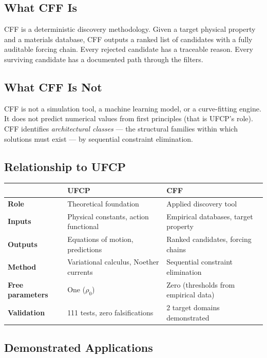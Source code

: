 \documentclass[11pt, a4paper]{article}
\begin{document}
\subsection*{What CFF Is}

CFF is a deterministic discovery methodology. Given a target physical
property and a materials database, CFF outputs a ranked list of
candidates with a fully auditable forcing chain. Every rejected
candidate has a traceable reason. Every surviving candidate has a
documented path through the filters.

\subsection*{What CFF Is Not}

CFF is not a simulation tool, a machine learning model, or a
curve-fitting engine. It does not predict numerical values from
first principles (that is UFCP's role). CFF identifies
\textit{architectural classes} --- the structural families within
which solutions must exist --- by sequential constraint elimination.

\subsection*{Relationship to UFCP}

\begin{center}
\begin{tabular}{@{}lll@{}}
\toprule
& \textbf{UFCP} & \textbf{CFF} \\
\midrule
\textbf{Role} & Theoretical foundation & Applied discovery tool \\
\textbf{Inputs} & Physical constants, action functional &
  Empirical databases, target property \\
\textbf{Outputs} & Equations of motion, predictions &
  Ranked candidates, forcing chains \\
\textbf{Method} & Variational calculus, Noether currents &
  Sequential constraint elimination \\
\textbf{Free parameters} & One ($\rho_0$) & Zero (thresholds
  from empirical data) \\
\textbf{Validation} & 111 tests, zero falsifications &
  2 target domains demonstrated \\
\bottomrule
\end{tabular}
\end{center}

\subsection*{Demonstrated Applications}
\end{document}
